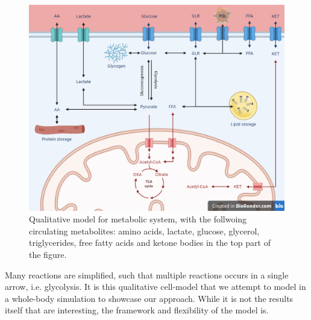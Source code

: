 \documentclass{IEEEtran}
\begin{document}
\begin{figure}[H]
    \centering
    \includegraphics[width=\columnwidth]{Diagrams/Qualitative model.png}
    \caption{Qualitative model for metabolic system, with the follwoing circulating metabolites: amino acids, lactate, glucose, glycerol, triglycerides, free fatty acids and ketone bodies in the top part of the figure.}
    \label{fig:Qualitative_cell}
\end{figure}


Many reactions are simplified, such that multiple reactions occurs in a single arrow, i.e. glycolysis. It is this qualitative cell-model that we attempt to model in a whole-body simulation to showcase our approach. While it is not the results itself that are interesting, the framework and flexibility of the model is. \\
\end{document}
